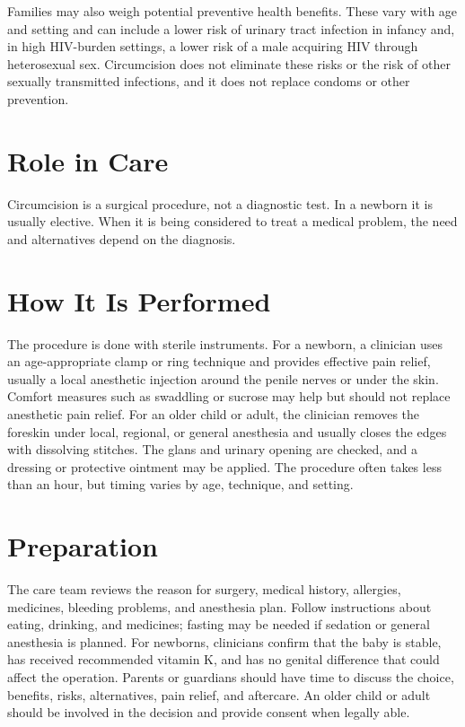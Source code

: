 Families may also weigh potential preventive health benefits. These vary with age and setting and can include a lower risk of urinary tract infection in infancy and, in high HIV-burden settings, a lower risk of a male acquiring HIV through heterosexual sex. Circumcision does not eliminate these risks or the risk of other sexually transmitted infections, and it does not replace condoms or other prevention.

\section*{Role in Care}
Circumcision is a surgical procedure, not a diagnostic test. In a newborn it is usually elective. When it is being considered to treat a medical problem, the need and alternatives depend on the diagnosis.

\section*{How It Is Performed}
The procedure is done with sterile instruments. For a newborn, a clinician uses an age-appropriate clamp or ring technique and provides effective pain relief, usually a local anesthetic injection around the penile nerves or under the skin. Comfort measures such as swaddling or sucrose may help but should not replace anesthetic pain relief. For an older child or adult, the clinician removes the foreskin under local, regional, or general anesthesia and usually closes the edges with dissolving stitches. The glans and urinary opening are checked, and a dressing or protective ointment may be applied. The procedure often takes less than an hour, but timing varies by age, technique, and setting.

\section*{Preparation}
The care team reviews the reason for surgery, medical history, allergies, medicines, bleeding problems, and anesthesia plan. Follow instructions about eating, drinking, and medicines; fasting may be needed if sedation or general anesthesia is planned. For newborns, clinicians confirm that the baby is stable, has received recommended vitamin K, and has no genital difference that could affect the operation. Parents or guardians should have time to discuss the choice, benefits, risks, alternatives, pain relief, and aftercare. An older child or adult should be involved in the decision and provide consent when legally able.

